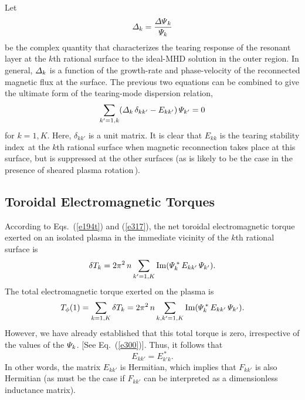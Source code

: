 \documentclass[12pt,prb,aps]{revtex4-1}
\begin{document}
Let
\begin{equation}\label{e403}
{\mit\Delta}_k = \frac{{\mit\Delta\Psi}_k}{{\mit\Psi}_k}
\end{equation}
 be the complex quantity that characterizes the
tearing response of the resonant layer at the $k$th rational surface to the ideal-MHD solution in the outer region.\cite{fkr}
In general, ${\mit\Delta}_k$ is a function of the growth-rate and phase-velocity of the reconnected magnetic flux at the surface.\cite{am1,layer,layer1}
The previous two equations can be combined to give the ultimate form of the  tearing-mode dispersion relation,
\begin{equation}\label{e317u}
\sum_{k'=1,k}({\mit\Delta}_k\,\delta_{kk'}-E_{kk'})\,{\mit\Psi}_{k'} = 0
\end{equation}
for $k=1,K$. 
Here, $\delta_{kk'}$ is a unit matrix. It is clear that $E_{kk}$ is the tearing stability index\,\cite{fkr} at the $k$th rational surface when magnetic reconnection  takes place
at this surface, but is suppressed at the other surfaces (as is likely to be the case in the presence of sheared plasma rotation\,\cite{am1}). 

\subsection{Toroidal Electromagnetic Torques}
According to Eqs.~(\ref{e194t}) and (\ref{e317}), the net toroidal electromagnetic torque exerted on an isolated plasma
in the immediate vicinity of the $k$th rational surface is
\begin{equation}\label{e405}
\delta T_k = 2\pi^2\,n\sum_{k'=1,K} {\rm Im}({\mit\Psi}_k^{\,\ast}\,E_{kk'}\,{\mit\Psi}_{k'}).
\end{equation}
The total electromagnetic torque exerted on the plasma is
\begin{equation}
T_\phi(1) = \sum_{k=1,K}\delta T_k =  2\pi^2\,n\sum_{k,k'=1,K} {\rm Im}({\mit\Psi}_k^{\,\ast}\,E_{kk'}\,{\mit\Psi}_{k'}).
\end{equation}
However, we have already established that this total torque is zero, irrespective of the values of the ${\mit\Psi}_k$. [See Eq.~(\ref{e300})].
Thus, it follows that
\begin{equation}
E_{kk'} = E_{k'k}^{\,\ast}.
\end{equation}
In other words, the matrix $E_{kk'}$ is Hermitian,\cite{am1} which implies that $F_{kk'}$ is also Hermitian (as must  be the case if $F_{kk'}$ can
be interpreted as 
a dimensionless inductance matrix). 
\end{document}
